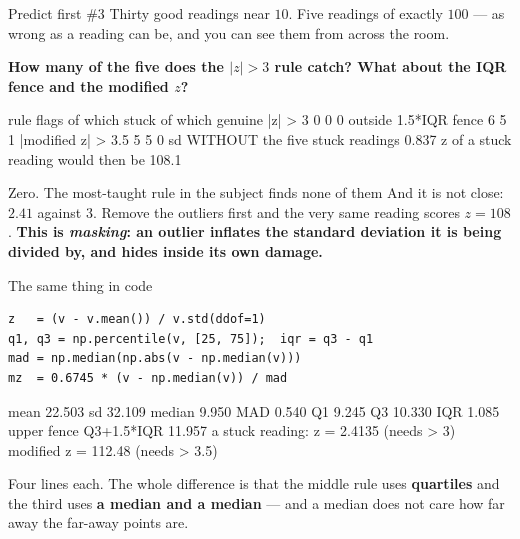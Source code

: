 \documentclass[aspectratio=169]{beamer}
\begin{document}
\begin{frame}[fragile,shrink=8]{Predict first \#3}
Thirty good readings near $10$. Five readings of exactly $100$ --- as wrong as
a reading can be, and you can see them from across the room.

\begin{center}
  \textbf{How many of the five does the $|z| > 3$ rule catch? What about the
  IQR fence and the modified $z$?}
\end{center}
\vspace{0.3em}
\begin{outblk}
rule                     flags   of which stuck   of which genuine
  |z| > 3                  0          0               0
  outside 1.5*IQR fence    6          5               1
  |modified z| > 3.5       5          5               0
sd WITHOUT the five stuck readings  0.837
z of a stuck reading would then be  108.1
\end{outblk}
\begin{alertblock}{Zero. The most-taught rule in the subject finds none of them}
  \footnotesize And it is not close: $2.41$ against $3$. Remove the outliers
  first and the very same reading scores $z = 108$. \textbf{This is
  \emph{masking}: an outlier inflates the standard deviation it is being
  divided by, and hides inside its own damage.}
\end{alertblock}
\end{frame}

\begin{frame}[fragile,shrink=4]{The same thing in code}
\begin{lstlisting}
z   = (v - v.mean()) / v.std(ddof=1)
q1, q3 = np.percentile(v, [25, 75]);  iqr = q3 - q1
mad = np.median(np.abs(v - np.median(v)))
mz  = 0.6745 * (v - np.median(v)) / mad
\end{lstlisting}
\begin{outblk}
  mean 22.503   sd 32.109   median 9.950   MAD 0.540
  Q1 9.245  Q3 10.330  IQR 1.085  upper fence Q3+1.5*IQR 11.957
  a stuck reading:  z = 2.4135  (needs > 3)   modified z = 112.48  (needs > 3.5)
\end{outblk}
\begin{center}\small
  Four lines each. The whole difference is that the middle rule uses
  \textbf{quartiles} and the third uses \textbf{a median and a median} --- and
  a median does not care how far away the far-away points are.
\end{center}
\end{frame}
\end{document}
